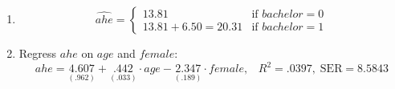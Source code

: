 \documentclass[12pt]{chmullighw}
\begin{document}
\begin{enumerate}
\begin{enumerate}
	
	\item $$\widehat{ahe} = \left\{
		\begin{array}{ll}
			13.81 & \mbox{if } bachelor = 0 \\
			13.81 + 6.50 = 20.31 & \mbox{if } bachelor = 1
		\end{array}
		\right.
		$$
	
	\item Regress $ahe$ on $age$ and $female$:
		$$ahe = \underset{(.962)}{4.607}
			 + \underset{(.033)}{.442}\cdot age
			 - \underset{(.189)}{2.347}\cdot female,
			\;\;\; R^2 = .0397, \; \text{SER} = 8.5843 $$
	\end{enumerate} %

\end{enumerate} %

\newpage

\end{document}
